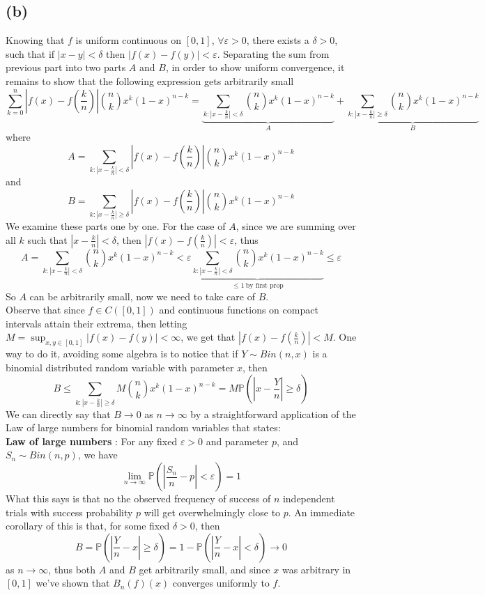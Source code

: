 \documentclass[12pt]{article}
\begin{document}
\subsection*{(b)}
Knowing that $f$ is uniform continuous on $[0,1]$, $\forall \varepsilon >0$, there exists a $\delta > 0$, such that if $|x-y| < \delta$ then $|f(x) - f(y)| < \varepsilon$. Separating the sum from previous part into two parts $A$ and $B$, in order to show uniform convergence, it remains to show that the following expression gets arbitrarily small
$$
\sum_{k=0}^n |f(x) - f(\frac{k}{n})| \binom{n}{k} x^k (1-x)^{n-k} = \underbrace{\sum_{k \colon |x - \frac{k}{n} |< \delta} \binom{n}{k} x^k (1-x)^{n-k}}_{A} + \underbrace{\sum_{k \colon |x-\frac{k}{n}| \geq \delta} \binom{n}{k} x^k (1-x)^{n-k}}_{B}
$$
where 
$$
A = \sum_{k \colon |x - \frac{k}{n} |< \delta} \left| f(x) - f\left(\frac{k}{n}\right)\right|\binom{n}{k} x^k (1-x)^{n-k}
$$
and 
$$
B = \sum_{k \colon |x - \frac{k}{n} | \geq \delta} \left| f(x) - f\left(\frac{k}{n}\right)\right|\binom{n}{k} x^k (1-x)^{n-k}
$$
We examine these parts one by one. For the case of $A$, since we are summing over all $k$ such that $|x - \frac{k}{n}| < \delta$, then $|f(x) - f(\frac{k}{n})| < \varepsilon$, thus
$$ A = \sum_{k \colon |x - \frac{k}{n} |< \delta} \binom{n}{k} x^k (1-x)^{n-k} < \varepsilon \underbrace{\sum_{k \colon |x - \frac{k}{n} |< \delta} \binom{n}{k} x^k (1-x)^{n-k}}_{\leq 1 \ \text{by first prop}} \leq \varepsilon
$$
So $A$ can be arbitrarily small, now we need to take care of $B$. \\
Observe that since $f \in C([0,1])$ and continuous functions on compact intervals attain their extrema, then letting $M = \sup_{x,y \in [0,1]} |f(x) - f(y)| < \infty$, we get that $ |f(x) - f(\frac{k}{n})| < M$. 
 One way to do it, avoiding some algebra is to notice that if $Y \sim Bin(n,x)$ is a binomial distributed random variable with parameter $x$, then 
$$
B \leq  \sum_{k \colon |x - \frac{k}{n} | \geq \delta} M\binom{n}{k} x^k (1-x)^{n-k} = M\mathbb{P}\left ( \left |x - \frac{Y}{n} \right | \geq \delta\right )
$$
We can directly say that $B \to 0$ as $n \to \infty$ by a straightforward application of the Law of large numbers for binomial random variables that states: \\
\textbf{Law of large numbers} : For any fixed $\varepsilon > 0$ and parameter $p$, and $S_n \sim Bin(n,p)$, we have 
$$
\lim_{n \to \infty} \mathbb{P}\left(\left| \frac{S_n}{n} - p\right| < \varepsilon \right)  = 1$$
What this says is that no the observed frequency of success of $n$ independent trials with success probability $p$ will get overwhelmingly close to $p$. 
An immediate corollary of this is that, for some fixed $\delta > 0$, then 
$$ B = \mathbb{P}\left(\left| \frac{Y}{n} - x\right| \geq \delta \right)   =1- \mathbb{P}\left(\left| \frac{Y}{n} - x\right| <  \delta \right)  \to 0 $$
as $n \to \infty$, thus both $A$ and $B$ get arbitrarily small, and since $x$ was arbitrary in $[0,1]$ we've shown that $B_n(f)(x)$ converges uniformly to $f$.  
\end{document}
